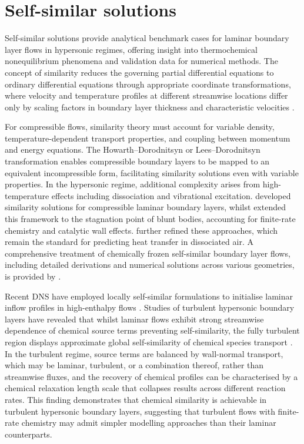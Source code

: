 \section{Self-similar solutions}
Self-similar solutions provide analytical benchmark cases for laminar boundary layer flows in hypersonic regimes, offering insight into thermochemical nonequilibrium phenomena and validation data for numerical methods. The concept of similarity reduces the governing partial differential equations to ordinary differential equations through appropriate coordinate transformations, where velocity and temperature profiles at different streamwise locations differ only by scaling factors in boundary layer thickness and characteristic velocities \citep{White2005}. 

For compressible flows, similarity theory must account for variable density, temperature-dependent transport properties, and coupling between momentum and energy equations. The Howarth--Dorodnitsyn or Lees--Dorodnitsyn transformation \citep{White2005} enables compressible boundary layers to be mapped to an equivalent incompressible form, facilitating similarity solutions even with variable properties. In the hypersonic regime, additional complexity arises from high-temperature effects including dissociation and vibrational excitation. \cite{Lees1956} developed similarity solutions for compressible laminar boundary layers, whilst \cite{FayRiddell1958} extended this framework to the stagnation point of blunt bodies, accounting for finite-rate chemistry and catalytic wall effects. \cite{LinanDaRiva1962} further refined these approaches, which remain the standard for predicting heat transfer in dissociated air. A comprehensive treatment of chemically frozen self-similar boundary layer flows, including detailed derivations and numerical solutions across various geometries, is provided by \cite{MiroMiroetal2020}.

Recent \gls{DNS} have employed locally self-similar formulations to initialise laminar inflow profiles in high-enthalpy flows \citep{DiRenzo2021}. Studies of turbulent hypersonic boundary layers have revealed that whilst laminar flows exhibit strong streamwise dependence of chemical source terms preventing self-similarity, the fully turbulent region displays approximate global self-similarity of chemical species transport \citep{PassiatoreDiRenzo2025}. In the turbulent regime, source terms are balanced by wall-normal transport, which may be laminar, turbulent, or a combination thereof, rather than streamwise fluxes, and the recovery of chemical profiles can be characterised by a chemical relaxation length scale that collapses results across different reaction rates. This finding demonstrates that chemical similarity is achievable in turbulent hypersonic boundary layers, suggesting that turbulent flows with finite-rate chemistry may admit simpler modelling approaches than their laminar counterparts.

